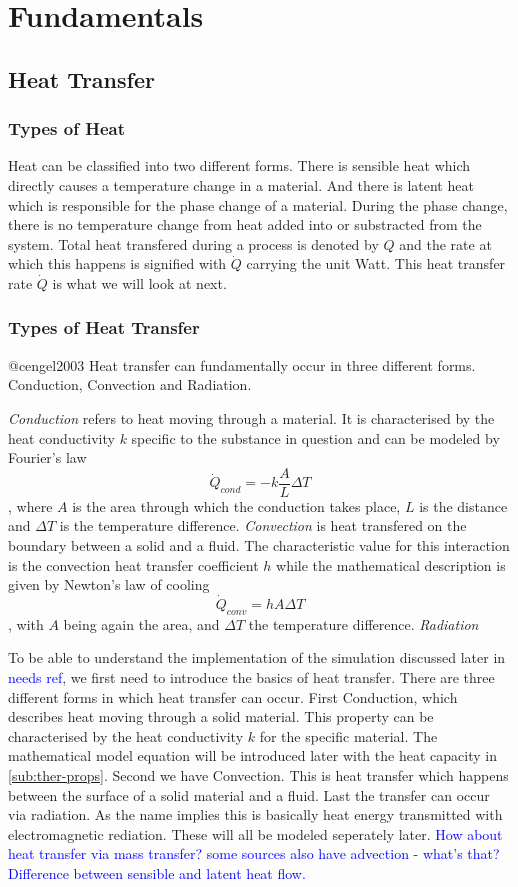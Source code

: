 \chapter{Fundamentals}
\label{chap:fundamentals}

\section{Heat Transfer}
\subsection{Types of Heat}
Heat can be classified into two different forms.
There is sensible heat which directly causes a temperature change in a material.
And there is latent heat which is responsible for the phase change of a material.
During the phase change, there is no temperature change from heat added into or substracted from the system.
Total heat transfered during a process is denoted by $Q$ and the rate at which this happens is signified with $\dot{Q}$ carrying the unit Watt.
This heat transfer rate $\dot{Q}$ is what we will look at next.

\subsection{Types of Heat Transfer}
@cengel2003
Heat transfer can fundamentally occur in three different forms.
Conduction, Convection and Radiation.

\textit{Conduction} refers to heat moving through a material.
It is characterised by the heat conductivity $k$ specific to the substance in question and can be modeled by Fourier's law
$$
\dot{Q}_{cond} = -k \frac{A}{L} \Delta T
$$,
where $A$ is the area through which the conduction takes place, $L$ is the distance and $\Delta T$ is the temperature difference.
\textit{Convection} is heat transfered on the boundary between a solid and a fluid.
The characteristic value for this interaction is the convection heat transfer coefficient $h$ while the mathematical description is given by Newton's law of cooling
$$
\dot{Q}_{conv} = h A \Delta T
$$,
with $A$ being again the area, and $\Delta T$ the temperature difference.
\textit{Radiation} 

To be able to understand the implementation of the simulation discussed later in \textcolor{blue}{needs ref}, we first need to introduce the basics of heat transfer. 
There are three different forms in which heat transfer can occur.
First Conduction, which describes heat moving through a solid material. This property can be characterised by the heat conductivity $k$ for the specific material.
The mathematical model equation will be introduced later with the heat capacity in \ref{sub:ther-props}.
Second we have Convection.
This is heat transfer which happens between the surface of a solid material and a fluid.
Last the transfer can occur via radiation.
As the name implies this is basically heat energy transmitted with electromagnetic rediation.
These will all be modeled seperately later.
\textcolor{blue}{How about heat transfer via mass transfer?}
\textcolor{blue}{some sources also have advection - what's that?}
\textcolor{blue}{Difference between sensible and latent heat flow.}

